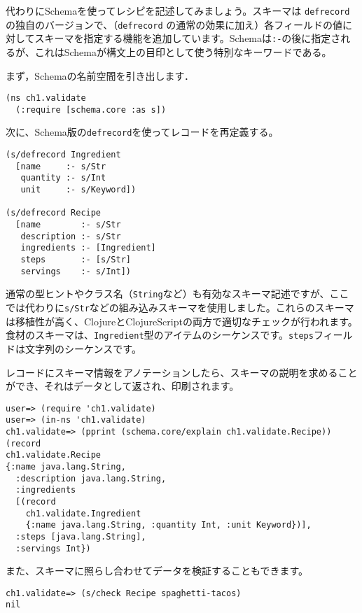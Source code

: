 代わりにSchemaを使ってレシピを記述してみましょう。スキーマは \texttt{defrecord} の独自のバージョンで、（\texttt{defrecord} の通常の効果に加え）各フィールドの値に対してスキーマを指定する機能を追加しています。Schemaは\texttt{:-}の後に指定されるが、これはSchemaが構文上の目印として使う特別なキーワードである。

まず，Schemaの名前空間を引き出します．

\begin{lstlisting}[numbers=none]
(ns ch1.validate
  (:require [schema.core :as s])
\end{lstlisting}

次に、Schema版の\texttt{defrecord}を使ってレコードを再定義する。

\begin{lstlisting}[numbers=none]
(s/defrecord Ingredient
  [name     :- s/Str
   quantity :- s/Int
   unit     :- s/Keyword])

(s/defrecord Recipe
  [name        :- s/Str
   description :- s/Str
   ingredients :- [Ingredient]
   steps       :- [s/Str]
   servings    :- s/Int])
\end{lstlisting}

通常の型ヒントやクラス名（\texttt{String}など）も有効なスキーマ記述ですが、ここでは代わりに\texttt{s/Str}などの組み込みスキーマを使用しました。これらのスキーマは移植性が高く、ClojureとClojureScriptの両方で適切なチェックが行われます。食材のスキーマは、\texttt{Ingredient}型のアイテムのシーケンスです。\texttt{steps}フィールドは文字列のシーケンスです。

レコードにスキーマ情報をアノテーションしたら、スキーマの説明を求めることができ、それはデータとして返され、印刷されます。

\begin{lstlisting}[numbers=none]
user=> (require 'ch1.validate)
user=> (in-ns 'ch1.validate)
ch1.validate=> (pprint (schema.core/explain ch1.validate.Recipe))
(record
ch1.validate.Recipe
{:name java.lang.String,
  :description java.lang.String,
  :ingredients
  [(record
    ch1.validate.Ingredient
    {:name java.lang.String, :quantity Int, :unit Keyword})],
  :steps [java.lang.String],
  :servings Int})
\end{lstlisting}

また、スキーマに照らし合わせてデータを検証することもできます。

\begin{lstlisting}[numbers=none]
ch1.validate=> (s/check Recipe spaghetti-tacos)
nil
\end{lstlisting}

